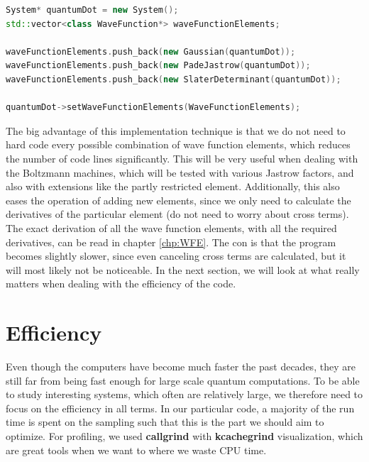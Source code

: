 \lstset{basicstyle=\scriptsize}
\begin{lstlisting}[language=c++,caption={The code was implemented in a flexible way such that all the wave function elements can be combined with other wave function elements by appending all the wanted elements to a vector, here named \lstinline{waveFunctionElements}, which again is set as the trial wave function using the function \lstinline{setWaveFunctionElements}.}]
System* quantumDot = new System();
std::vector<class WaveFunction*> waveFunctionElements;

waveFunctionElements.push_back(new Gaussian(quantumDot));
waveFunctionElements.push_back(new PadeJastrow(quantumDot));
waveFunctionElements.push_back(new SlaterDeterminant(quantumDot));

quantumDot->setWaveFunctionElements(WaveFunctionElements);
\end{lstlisting}

The big advantage of this implementation technique is that we do not need to hard code every possible combination of wave function elements, which reduces the number of code lines significantly. This will be very useful when dealing with the Boltzmann machines, which will be tested with various Jastrow factors, and also with extensions like the partly restricted element. Additionally, this also eases the operation of adding new elements, since we only need to calculate the derivatives of the particular element (do not need to worry about cross terms). The exact derivation of all the wave function elements, with all the required derivatives, can be read in chapter \ref{chp:WFE}. The con is that the program becomes slightly slower, since even canceling cross terms are calculated, but it will most likely not be noticeable. In the next section, we will look at what really matters when dealing with the efficiency of the code.

\section{Efficiency}
Even though the computers have become much faster the past decades, they are still far from being fast enough for large scale quantum computations. To be able to study interesting systems, which often are relatively large, we therefore need to focus on the efficiency in all terms. In our particular code, a majority of the run time is spent on the sampling such that this is the part we should aim to optimize. For profiling, we used \textbf{callgrind} with \textbf{kcachegrind} visualization, which are great tools when we want to where we waste CPU time. 

